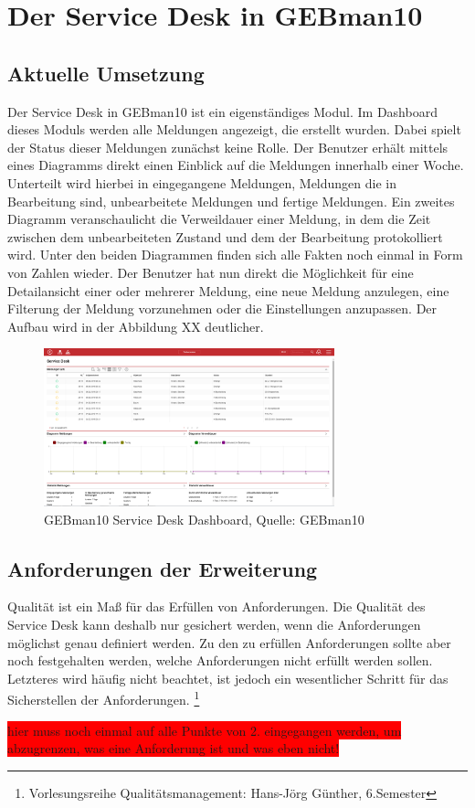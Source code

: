 
\section{Der Service Desk in GEBman10}

\subsection{Aktuelle Umsetzung}
\noindent
Der Service Desk in GEBman10 ist ein eigenständiges Modul. Im Dashboard dieses Moduls werden alle Meldungen angezeigt, die erstellt wurden. Dabei spielt der Status dieser Meldungen zunächst keine Rolle. Der Benutzer erhält mittels eines Diagramms direkt einen Einblick auf die Meldungen innerhalb einer Woche. Unterteilt wird hierbei in eingegangene Meldungen, Meldungen die in Bearbeitung sind, unbearbeitete Meldungen und fertige Meldungen. Ein zweites Diagramm veranschaulicht die Verweildauer einer Meldung, in dem die Zeit zwischen dem unbearbeiteten Zustand und dem der Bearbeitung protokolliert wird. Unter den beiden Diagrammen finden sich alle Fakten noch einmal in Form von Zahlen wieder. Der Benutzer hat nun direkt die Möglichkeit für eine Detailansicht einer oder mehrerer Meldung, eine neue Meldung anzulegen, eine Filterung der Meldung vorzunehmen oder die Einstellungen anzupassen. Der Aufbau wird in der Abbildung XX deutlicher. 

\begin{figure}[h!]
\centering
	\includegraphics[width=0.75\textwidth]{Abbildungen/GEBman_Service_Desk_Dashboard}
	\caption[GEBman10 Service Desk Dashboard]{GEBman10 Service Desk Dashboard, Quelle: 
	GEBman10}
	\label{fig:ITIL_Lebenyzyklus}
\end{figure}


\subsection{Anforderungen der Erweiterung}

\noindent
Qualität ist ein Maß für das Erfüllen von Anforderungen. Die Qualität des Service Desk kann deshalb nur gesichert werden, wenn die Anforderungen möglichst genau definiert werden. Zu den zu erfüllen Anforderungen sollte aber noch festgehalten werden, welche Anforderungen nicht erfüllt werden sollen. Letzteres wird häufig nicht beachtet, ist jedoch ein wesentlicher Schritt für das Sicherstellen der Anforderungen. \footnote{Vorlesungsreihe Qualitätsmanagement: Hans-Jörg Günther, 6.Semester}

\colorbox{red}{hier muss noch einmal auf alle Punkte von 2. eingegangen werden, um abzugrenzen, was eine Anforderung ist und was eben nicht! }